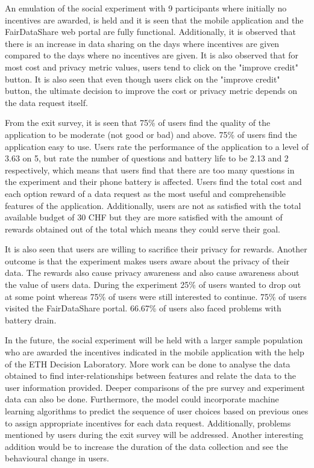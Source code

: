 An emulation of the social experiment with 9 participants where initially no incentives are awarded, is held and it is seen that the mobile application and the FairDataShare web portal are fully functional. Additionally, it is observed that there is an increase in data sharing on the days where incentives are given compared to the days where no incentives are given. It is also observed that for most cost and privacy metric values, users tend to click on the "improve credit" button. It is also seen that even though users click on the "improve credit" button, the ultimate decision to improve the cost or privacy metric depends on the data request itself.

From the exit survey, it is seen that 75\% of users find the quality of the application to be moderate (not good or bad) and above. 75\% of users find the application easy to use. Users rate the performance of the application to a level of 3.63 on 5, but rate the number of questions and battery life to be 2.13 and 2 respectively, which means that users find that there are too many questions in the experiment and their phone battery is affected. Users find the total cost and each option reward of a data request as the most useful and comprehensible features of the application. Additionally, users are not as satisfied with the total available budget of 30 CHF but they are more satisfied with the amount of rewards obtained out of the total which means they could serve their goal.

It is also seen that users are willing to sacrifice their privacy for rewards. Another outcome is that the experiment makes users aware about the privacy of their data. The rewards also cause privacy awareness and also cause awareness about the value of users data. During the experiment 25\% of users wanted to drop out at some point whereas 75\% of users were still interested to continue. 75\% of users visited the FairDataShare portal. 66.67\% of users also faced problems with battery drain.

In the future, the social experiment will be held with a larger sample population who are awarded the incentives indicated in the mobile application with the help of the ETH Decision Laboratory. More work can be done to analyse the data obtained to find inter-relationships between features and relate the data to the user information provided. Deeper comparisons of the pre survey and experiment data can also be done. Furthermore, the model could incorporate machine learning algorithms to predict the sequence of user choices based on previous ones to assign appropriate incentives for each data request. Additionally, problems mentioned by users during the exit survey will be addressed. Another interesting addition would be to increase the duration of the data collection and see the behavioural change in users.
